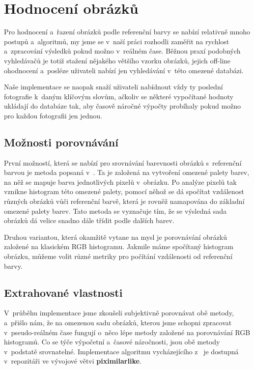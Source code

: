 \documentclass[12pt,oneside,a4paper]{article}
\begin{document}
\section{Hodnocení obrázků}
Pro hodnocení a~řazení obrázků podle referenční barvy se nabízí relativně mnoho postupů a~algoritmů, my jsme se v~naší práci rozhodli zaměřit na rychlost a~zpracování výsledků pokud možno v~reálném čase. Běžnou praxí podobných vyhledávačů je totiž stažení nějakého většího vzorku obrázků, jejich off-line ohodnocení a~posléze uživateli nabízí jen vyhledávání v~této omezené databázi.

Naše implementace se naopak snaží uživateli nabídnout vždy ty poslední fotografie k~daným klíčovým slovům, ačkoliv se některé vypočítané hodnoty ukládají do databáze tak, aby časově náročné výpočty probíhaly pokud možno pro každou fotografii jen jednou.

\subsection{Možnosti porovnávání}
První možností, která se nabízí pro srovnávání barevnosti obrázků s~referenční barvou je metoda popsaná v~\cite{Mueller2k9}. Ta je založená na vytvoření omezené palety barev, na něž se mapuje barva jednotlivých pixelů v~obrázku. Po analýze pixelů tak vznikne histogram této omezené palety, pomocí něhož se dá spočítat vzdálenost různých obrázků vůči referenční barvě, která je rovněž namapována do základní omezené palety barev. Tato metoda se vyznačuje tím, že se výsledná sada obrázků dá velice snadno dále třídit podle dalších barev.

Druhou variantou, která okamžitě vytane na mysl je porovnávání obrázků založené na klasickém RGB histogramu. Jakmile máme spočítaný histogram obrázku, můžeme volit různé metriky pro počítání vzdálenosti od referenční barvy.

\subsection{Extrahované vlastnosti}

V~průběhu implementace jsme zkoušeli subjektivně porovnávat obě metody, a~přišlo nám, že na omezenou sadu obrázků, kterou jsme schopni zpracovat v~pseudo-reálném čase fungují o~něco lépe metody založené na porovnávání RGB histogramů. Co se týče výpočetní a~časové náročnosti, jsou obě metody v~podstatě srovnatelné. Implementace algoritmu vycházejícího z~\cite{Mueller2k9} je dostupná v~repozitáři \cite{official} ve vývojové větvi \textbf{piximilarlike}.
\end{document}
